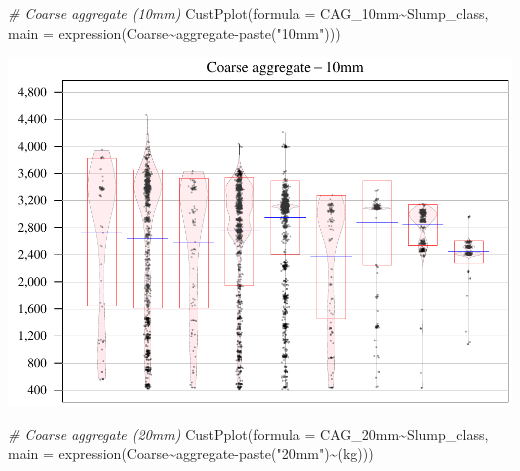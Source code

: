 \documentclass[
]{article}
\newenvironment{Shaded}{\begin{snugshade}}{\end{snugshade}}
\newcommand{\AttributeTok}[1]{\textcolor[rgb]{0.77,0.63,0.00}{#1}}
\newcommand{\CommentTok}[1]{\textcolor[rgb]{0.56,0.35,0.01}{\textit{#1}}}
\newcommand{\FunctionTok}[1]{\textcolor[rgb]{0.00,0.00,0.00}{#1}}
\newcommand{\NormalTok}[1]{#1}
\newcommand{\SpecialCharTok}[1]{\textcolor[rgb]{0.00,0.00,0.00}{#1}}
\newcommand{\StringTok}[1]{\textcolor[rgb]{0.31,0.60,0.02}{#1}}
\begin{document}
\begin{Shaded}
\begin{Highlighting}[]
\CommentTok{\# Coarse aggregate (10mm)}
\FunctionTok{CustPplot}\NormalTok{(}\AttributeTok{formula =}\NormalTok{ CAG\_10mm}\SpecialCharTok{\textasciitilde{}}\NormalTok{Slump\_class,}
          \AttributeTok{main =} \FunctionTok{expression}\NormalTok{(Coarse}\SpecialCharTok{\textasciitilde{}}\NormalTok{aggregate}\SpecialCharTok{{-}}\FunctionTok{paste}\NormalTok{(}\StringTok{"10mm"}\NormalTok{)))}
\end{Highlighting}
\end{Shaded}

\begin{center}\includegraphics{sl-inf-cairs-2301_files/figure-latex/dataInsights-5} \end{center}

\begin{Shaded}
\begin{Highlighting}[]
\CommentTok{\# Coarse aggregate (20mm)}
\FunctionTok{CustPplot}\NormalTok{(}\AttributeTok{formula =}\NormalTok{ CAG\_20mm}\SpecialCharTok{\textasciitilde{}}\NormalTok{Slump\_class,}
          \AttributeTok{main =} \FunctionTok{expression}\NormalTok{(Coarse}\SpecialCharTok{\textasciitilde{}}\NormalTok{aggregate}\SpecialCharTok{{-}}\FunctionTok{paste}\NormalTok{(}\StringTok{"20mm"}\NormalTok{)}\SpecialCharTok{\textasciitilde{}}\NormalTok{(kg)))}
\end{Highlighting}
\end{Shaded}
\end{document}
